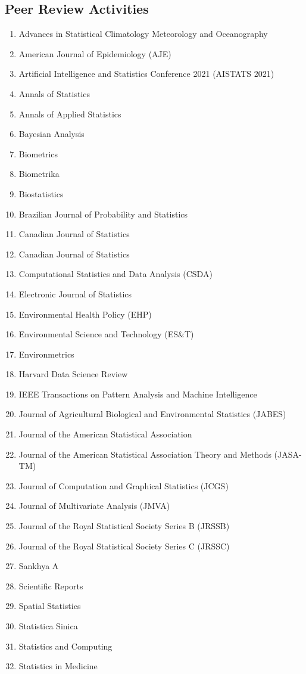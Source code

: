 \documentclass[12pt]{article}
\begin{document}
\subsection*{Peer Review Activities} %
\begin{enumerate}
	\item Advances in Statistical Climatology Meteorology and Oceanography %
	\item American Journal of Epidemiology (AJE) %
	\item  Artificial Intelligence and Statistics Conference 2021 (AISTATS 2021) %
	\item Annals of Statistics %
	\item Annals of Applied Statistics %
	\item Bayesian Analysis %
	\item Biometrics %
	\item Biometrika %
	\item Biostatistics %
	\item Brazilian Journal of Probability and Statistics %
	\item Canadian Journal of Statistics %
	\item Canadian Journal of Statistics %
	\item Computational Statistics and Data Analysis (CSDA) %
	\item Electronic Journal of Statistics %
	\item Environmental Health Policy (EHP) %
	\item Environmental Science and Technology (ES\&T) %
	\item Environmetrics %
	\item Harvard Data Science Review %
	\item IEEE Transactions on Pattern Analysis and Machine Intelligence %
	\item Journal of Agricultural Biological and Environmental Statistics (JABES) %
	\item Journal of the American Statistical Association 
	\item Journal of the American Statistical Association Theory and Methods (JASA-TM) %
	\item Journal of Computation and Graphical Statistics (JCGS) %
	\item Journal of Multivariate Analysis (JMVA) %
	\item Journal of the Royal Statistical Society Series B (JRSSB) %
	\item Journal of the Royal Statistical Society Series C (JRSSC) %
	\item Sankhya A %
	\item Scientific Reports %
	\item Spatial Statistics %
	\item Statistica Sinica %
	\item Statistics and Computing %
	\item Statistics in Medicine %
\end{enumerate}
\end{document}
